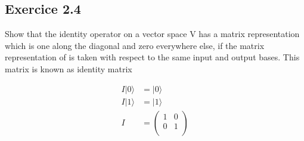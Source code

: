 \documentclass{article}
\begin{document}
\subsection{Exercice 2.4}

Show that the identity operator on a vector space V has a matrix representation which is
one along the diagonal and zero everywhere else, if the matrix representation of is taken with respect to the
same input and output bases. This matrix is known as identity matrix

\begin{equation}
    \begin{split}
        I|0\rangle & = |0\rangle \\
        I|1\rangle & = |1\rangle \\
        I & = \begin{pmatrix}
            1 & 0 \\
            0 & 1 \\
        \end{pmatrix} \\
    \end{split}
\end{equation}
\end{document}

